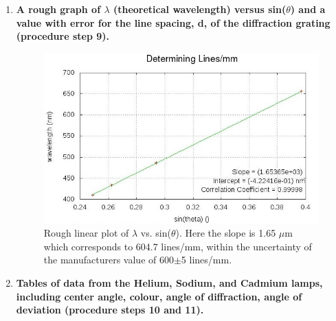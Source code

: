 \begin{enumerate}
\item {\bf A rough graph of $\lambda$ (theoretical wavelength) versus sin($\theta$) and a value with error for the line spacing, d, of the diffraction grating (procedure step 9).}\newline

\begin{figure}
\includegraphics{Spectroscopy-calibration.jpg}
\caption{Rough linear plot of $\lambda$ vs. sin($\theta$). Here the slope is 1.65 $\mu$m which corresponds to 604.7 lines/mm, within the uncertainty of the manufacturers value of 600$\pm$5 lines/mm.}
\label{fig:spcg1}
\end{figure}

\item {\bf Tables of data from the Helium, Sodium, and Cadmium lamps, including center angle, colour, angle of diffraction, angle of deviation (procedure steps 10 and 11).}\newline


\end{enumerate}

